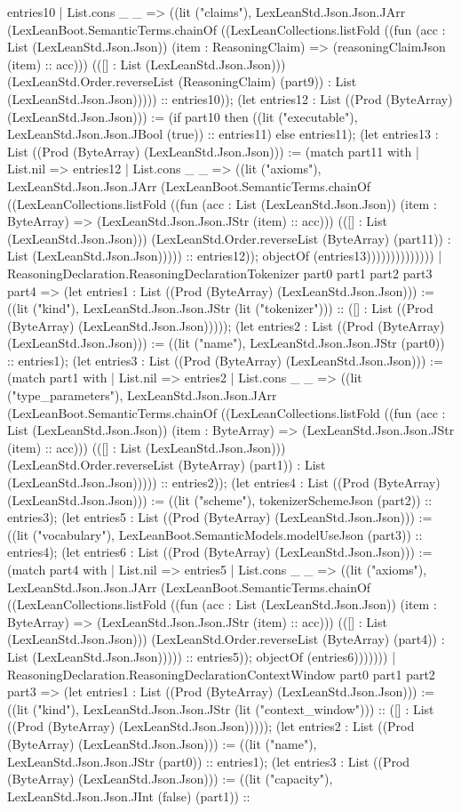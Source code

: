 \documentclass[11pt]{article}
\begin{document}
entries10 | List.cons \_ \_ => ((lit ("claims"), LexLeanStd.Json.Json.JArr (LexLeanBoot.SemanticTerms.chainOf ((LexLeanCollections.listFold ((fun (acc : List (LexLeanStd.Json.Json)) (item : ReasoningClaim) => (reasoningClaimJson (item) :: acc))) (([] : List (LexLeanStd.Json.Json))) (LexLeanStd.Order.reverseList (ReasoningClaim) (part9)) : List (LexLeanStd.Json.Json))))) :: entries10)); (let entries12 : List ((Prod (ByteArray) (LexLeanStd.Json.Json))) := (if part10 then ((lit ("executable"), LexLeanStd.Json.Json.JBool (true)) :: entries11) else entries11); (let entries13 : List ((Prod (ByteArray) (LexLeanStd.Json.Json))) := (match part11 with | List.nil => entries12 | List.cons \_ \_ => ((lit ("axioms"), LexLeanStd.Json.Json.JArr (LexLeanBoot.SemanticTerms.chainOf ((LexLeanCollections.listFold ((fun (acc : List (LexLeanStd.Json.Json)) (item : ByteArray) => (LexLeanStd.Json.Json.JStr (item) :: acc))) (([] : List (LexLeanStd.Json.Json))) (LexLeanStd.Order.reverseList (ByteArray) (part11)) : List (LexLeanStd.Json.Json))))) :: entries12)); objectOf (entries13)))))))))))))) | ReasoningDeclaration.ReasoningDeclarationTokenizer part0 part1 part2 part3 part4 => (let entries1 : List ((Prod (ByteArray) (LexLeanStd.Json.Json))) := ((lit ("kind"), LexLeanStd.Json.Json.JStr (lit ("tokenizer"))) :: ([] : List ((Prod (ByteArray) (LexLeanStd.Json.Json))))); (let entries2 : List ((Prod (ByteArray) (LexLeanStd.Json.Json))) := ((lit ("name"), LexLeanStd.Json.Json.JStr (part0)) :: entries1); (let entries3 : List ((Prod (ByteArray) (LexLeanStd.Json.Json))) := (match part1 with | List.nil => entries2 | List.cons \_ \_ => ((lit ("type\_parameters"), LexLeanStd.Json.Json.JArr (LexLeanBoot.SemanticTerms.chainOf ((LexLeanCollections.listFold ((fun (acc : List (LexLeanStd.Json.Json)) (item : ByteArray) => (LexLeanStd.Json.Json.JStr (item) :: acc))) (([] : List (LexLeanStd.Json.Json))) (LexLeanStd.Order.reverseList (ByteArray) (part1)) : List (LexLeanStd.Json.Json))))) :: entries2)); (let entries4 : List ((Prod (ByteArray) (LexLeanStd.Json.Json))) := ((lit ("scheme"), tokenizerSchemeJson (part2)) :: entries3); (let entries5 : List ((Prod (ByteArray) (LexLeanStd.Json.Json))) := ((lit ("vocabulary"), LexLeanBoot.SemanticModels.modelUseJson (part3)) :: entries4); (let entries6 : List ((Prod (ByteArray) (LexLeanStd.Json.Json))) := (match part4 with | List.nil => entries5 | List.cons \_ \_ => ((lit ("axioms"), LexLeanStd.Json.Json.JArr (LexLeanBoot.SemanticTerms.chainOf ((LexLeanCollections.listFold ((fun (acc : List (LexLeanStd.Json.Json)) (item : ByteArray) => (LexLeanStd.Json.Json.JStr (item) :: acc))) (([] : List (LexLeanStd.Json.Json))) (LexLeanStd.Order.reverseList (ByteArray) (part4)) : List (LexLeanStd.Json.Json))))) :: entries5)); objectOf (entries6))))))) | ReasoningDeclaration.ReasoningDeclarationContextWindow part0 part1 part2 part3 => (let entries1 : List ((Prod (ByteArray) (LexLeanStd.Json.Json))) := ((lit ("kind"), LexLeanStd.Json.Json.JStr (lit ("context\_window"))) :: ([] : List ((Prod (ByteArray) (LexLeanStd.Json.Json))))); (let entries2 : List ((Prod (ByteArray) (LexLeanStd.Json.Json))) := ((lit ("name"), LexLeanStd.Json.Json.JStr (part0)) :: entries1); (let entries3 : List ((Prod (ByteArray) (LexLeanStd.Json.Json))) := ((lit ("capacity"), LexLeanStd.Json.Json.JInt (false) (part1)) :: 
\end{document}
